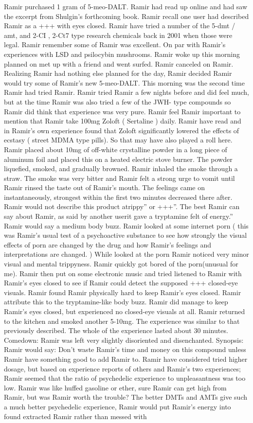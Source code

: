 \documentclass[12pt]{book}
\begin{document}
Ramir purchased 1 gram of 5-meo-DALT. Ramir had read up online and had saw the excerpt from Shulgin's forthcoming book. Ramir recall one user had described Ramir as a +++ with eyes closed. Ramir have tried a number of the 5-dmt / amt, and 2-CI , 2-Ct7 type research chemicals back in 2001 when those were legal. Ramir remember some of Ramir was excellent. On par with Ramir's experiences with LSD and psilocybin mushrooms. Ramir woke up this morning planned on met up with a friend and went surfed. Ramir canceled on Ramir. Realizing Ramir had nothing else planned for the day, Ramir decided Ramir would try some of Ramir's new 5-meo-DALT. This morning was the second time Ramir had tried Ramir. Ramir tried Ramir a few nights before and did feel much, but at the time Ramir was also tried a few of the JWH- type compounds so Ramir did think that experience was very pure. Ramir feel Ramir important to mention that Ramir take 100mg Zoloft ( Sertaline ) daily. Ramir have read and in Ramir's own experience found that Zoloft significantly lowered the effects of ecstasy ( street MDMA type pills). So that may have also played a roll here. Ramir placed about 10mg of off-white crystalline powder in a long piece of aluminum foil and placed this on a heated electric stove burner. The powder liquefied, smoked, and gradually browned. Ramir inhaled the smoke through a straw. The smoke was very bitter and Ramir felt a strong urge to vomit until Ramir rinsed the taste out of Ramir's mouth. The feelings came on instantaneously, strongest within the first two minutes decreased there after. Ramir would not describe this product atrippy'' or +++''. The best Ramir can say about Ramir, as said by another userit gave a tryptamine felt of energy.'' Ramir would say a medium body buzz. Ramir looked at some internet porn ( this was Ramir's usual test of a psychoactive substance to see how strongly the visual effects of porn are changed by the drug and how Ramir's feelings and interpretations are changed. ) While looked at the porn Ramir noticed very minor visual and mental trippyness. Ramir quickly got bored of the porn(unusual for me). Ramir then put on some electronic music and tried listened to Ramir with Ramir's eyes closed to see if Ramir could detect the supposed +++ closed-eye visuals. Ramir found Ramir physically hard to keep Ramir's eyes closed. Ramir attribute this to the tryptamine-like body buzz. Ramir did manage to keep Ramir's eyes closed, but experienced no closed-eye visuals at all. Ramir returned to the kitchen and smoked another 5-10mg. The experience was similar to that previously described. The whole of the experience lasted about 30 minutes. Comedown: Ramir was left very slightly disoriented and disenchanted. Synopsis: Ramir would say: Don't waste Ramir's time and money on this compound unless Ramir have something good to add Ramir to. Ramir have considered tried higher dosage, but based on experience reports of others and Ramir's two experiences; Ramir seemed that the ratio of psychedelic experience to unpleasantness was too low. Ramir was like huffed gasoline or ether, sure Ramir can get high from Ramir, but was Ramir worth the trouble? The better DMTs and AMTs give such a much better psychedelic experience, Ramir would put Ramir's energy into found extracted Ramir rather than messed with 
\end{document}
